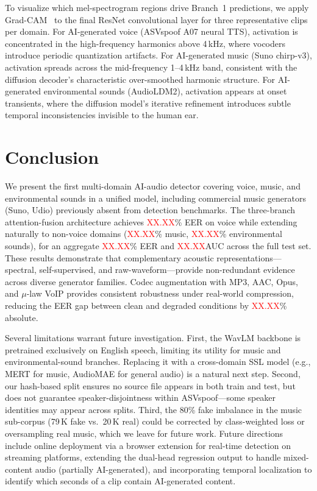 \documentclass[10pt,twocolumn,a4paper]{article}
\newcommand{\NUM}{\textcolor{red}{XX.XX}}
\begin{document}
To visualize which mel-spectrogram regions drive Branch~1 predictions, we apply Grad-CAM~\cite{gradcam} to the final ResNet convolutional layer for three representative clips per domain. For AI-generated voice (ASVspoof A07 neural TTS), activation is concentrated in the high-frequency harmonics above 4\,kHz, where vocoders introduce periodic quantization artifacts. For AI-generated music (Suno chirp-v3), activation spreads across the mid-frequency 1--4\,kHz band, consistent with the diffusion decoder's characteristic over-smoothed harmonic structure. For AI-generated environmental sounds (AudioLDM2), activation appears at onset transients, where the diffusion model's iterative refinement introduces subtle temporal inconsistencies invisible to the human ear.

\section{Conclusion}
\label{sec:conclusion}

We present the first multi-domain AI-audio detector covering voice, music, and environmental sounds in a unified model, including commercial music generators (Suno, Udio) previously absent from detection benchmarks. The three-branch attention-fusion architecture achieves \NUM\% EER on voice while extending naturally to non-voice domains (\NUM\% music, \NUM\% environmental sounds), for an aggregate \NUM\% EER and \NUM AUC across the full test set. These results demonstrate that complementary acoustic representations---spectral, self-supervised, and raw-waveform---provide non-redundant evidence across diverse generator families. Codec augmentation with MP3, AAC, Opus, and $\mu$-law VoIP provides consistent robustness under real-world compression, reducing the EER gap between clean and degraded conditions by \NUM\% absolute.

Several limitations warrant future investigation. First, the WavLM backbone is pretrained exclusively on English speech, limiting its utility for music and environmental-sound branches. Replacing it with a cross-domain SSL model (e.g., MERT for music, AudioMAE for general audio) is a natural next step. Second, our hash-based split ensures no source file appears in both train and test, but does not guarantee speaker-disjointness within ASVspoof---some speaker identities may appear across splits. Third, the 80\% fake imbalance in the music sub-corpus (79\,K fake vs.\ 20\,K real) could be corrected by class-weighted loss or oversampling real music, which we leave for future work. Future directions include online deployment via a browser extension for real-time detection on streaming platforms, extending the dual-head regression output to handle mixed-content audio (partially AI-generated), and incorporating temporal localization to identify which seconds of a clip contain AI-generated content.
\end{document}
